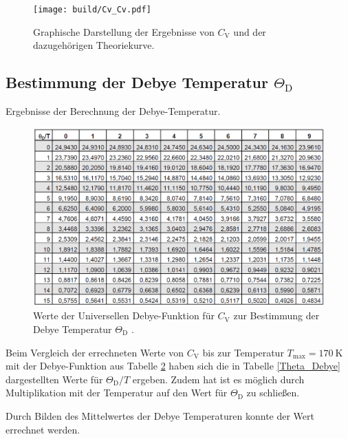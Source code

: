 \begin{figure}
	\centering
	\texttt{[image: build/Cv\_Cv.pdf]}
	\caption[]{Graphische Darstellung der Ergebnisse von $C_\mathrm{V}$ und der dazugehörigen Theoriekurve.}
	\label{Cv_gra}
\end{figure}

\subsection{Bestimmung der Debye Temperatur $\Theta_\mathrm{D}$} %
\label{sub:bestimmung_der_debye_temperatur_theta_mathrm}

\begin{table}[!h]
	\centering
	\caption[]{Ergebnisse der Berechnung der Debye-Temperatur.}
	
	\label{Theta_Debye}
\end{table}

\begin{figure}[!h]
	\centering
	\includegraphics[width = 14cm]{img/theta.png}
	\caption[]{Werte der Universellen Debye-Funktion für $C_\mathrm{V}$ zur Bestimmung der Debye Temperatur $\Theta_\mathrm{D}$ \cite{V47}.}
	\label{Cv_global}
\end{figure}

Beim Vergleich der errechneten Werte von $C_\mathrm{V}$ bis zur Temperatur $T_\text{max} = \SI{170}{\kelvin}$ mit der Debye-Funktion aus Tabelle \ref{Cv_global} haben sich die in Tabelle \ref{Theta_Debye} dargestellten Werte für $\Theta_\text{D} / T$ ergeben.
Zudem hat ist es möglich durch Multiplikation mit der Temperatur auf den Wert für $\Theta_\text{D}$ zu schließen.

Durch Bilden des Mittelwertes der Debye Temperaturen konnte der Wert  errechnet werden.
\FloatBarrier
